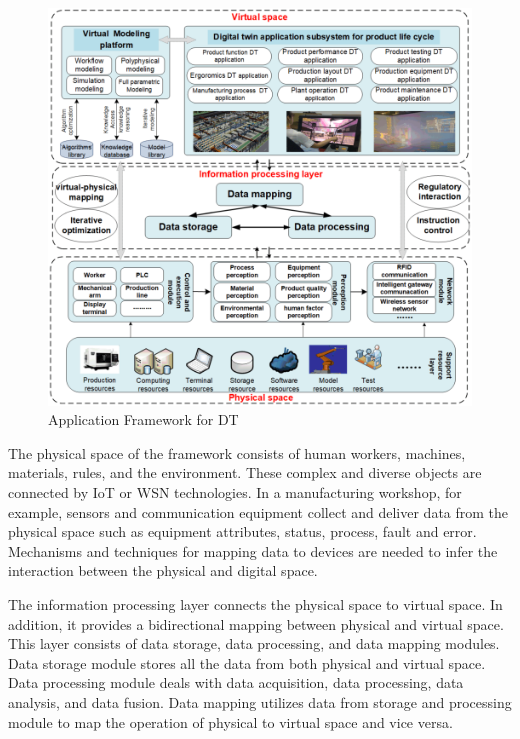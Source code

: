 \documentclass[article]{aaltoseries}
\begin{document}
\begin{figure}[t!]
	\begin{center}
		\includegraphics[width=1\textwidth]{figures/app_framework_yu_zheng_et_al}
		\caption{Application Framework for DT \cite{zheng2019application}}
		\label{fig:app_framwork_zheng}
	\end{center}
\end{figure}

The physical space of the framework consists of human workers, machines, materials, rules, and the environment. These complex and diverse objects are connected by IoT or WSN technologies. In a manufacturing workshop, for example, sensors and communication equipment collect and deliver data from the physical space such as equipment attributes, status, process, fault and error. Mechanisms and techniques for mapping data to devices are needed to infer the interaction between the physical and digital space.

The information processing layer connects the physical space to virtual space. In addition, it provides a bidirectional mapping between physical and virtual space. This layer consists of data storage, data processing, and data mapping modules. Data storage module stores all the data from both physical and virtual space. Data processing module deals with data acquisition, data processing, data analysis, and data fusion. Data mapping utilizes data from storage and processing module to map the operation of physical to virtual space and vice versa.
\end{document}
